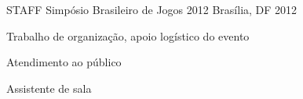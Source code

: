 \begin{cventries}
  \cventry
    {STAFF} %
    {Simpósio Brasileiro de Jogos 2012} %
    {Brasília, DF} %
    {2012} %
    {
      \begin{cvitems} %
        \item {Trabalho de organização, apoio logístico do evento}
       	\item {Atendimento ao público}
       	\item {Assistente de sala}
      \end{cvitems}
    }

\end{cventries}
